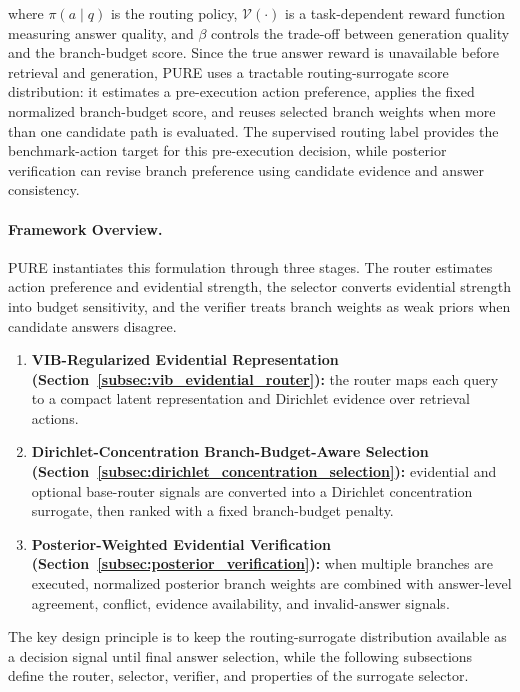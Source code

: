 \documentclass[a4paper,fleqn]{cas-dc}
\begin{document}
where $\pi(a\mid q)$ is the routing policy, $\mathcal{V}(\cdot)$ is a task-dependent reward function measuring answer quality, and $\beta$ controls the trade-off between generation quality and the branch-budget score. 
Since the true answer reward is unavailable before retrieval and generation, PURE uses a tractable routing-surrogate score distribution: it estimates a pre-execution action preference, applies the fixed normalized branch-budget score, and reuses selected branch weights when more than one candidate path is evaluated. 
The supervised routing label provides the benchmark-action target for this pre-execution decision, while posterior verification can revise branch preference using candidate evidence and answer consistency.

\paragraph{Framework Overview.}
PURE instantiates this formulation through three stages. The router estimates action preference and evidential strength, the selector converts evidential strength into budget sensitivity, and the verifier treats branch weights as weak priors when candidate answers disagree.
\begin{enumerate}
    \item \textbf{VIB-Regularized Evidential Representation (Section~\ref{subsec:vib_evidential_router}):} the router maps each query to a compact latent representation and Dirichlet evidence over retrieval actions.

    \item \textbf{Dirichlet-Concentration Branch-Budget-Aware Selection (Section~\ref{subsec:dirichlet_concentration_selection}):} evidential and optional base-router signals are converted into a Dirichlet concentration surrogate, then ranked with a fixed branch-budget penalty.

    \item \textbf{Posterior-Weighted Evidential Verification (Section~\ref{subsec:posterior_verification}):} when multiple branches are executed, normalized posterior branch weights are combined with answer-level agreement, conflict, evidence availability, and invalid-answer signals.
\end{enumerate}
The key design principle is to keep the routing-surrogate distribution available as a decision signal until final answer selection, while the following subsections define the router, selector, verifier, and properties of the surrogate selector.
\end{document}
